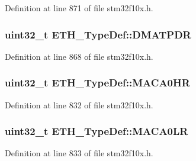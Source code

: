 Definition at line 871 of file stm32f10x.\+h.

\subsubsection[{\texorpdfstring{D\+M\+A\+T\+P\+DR}{DMATPDR}}]{ {\bf uint32\+\_\+t} E\+T\+H\+\_\+\+Type\+Def\+::\+D\+M\+A\+T\+P\+DR}\hypertarget{struct_e_t_h___type_def_aab836646e2e03cde9af74e439e875403}{}\label{struct_e_t_h___type_def_aab836646e2e03cde9af74e439e875403}


Definition at line 868 of file stm32f10x.\+h.

\subsubsection[{\texorpdfstring{M\+A\+C\+A0\+HR}{MACA0HR}}]{ {\bf uint32\+\_\+t} E\+T\+H\+\_\+\+Type\+Def\+::\+M\+A\+C\+A0\+HR}\hypertarget{struct_e_t_h___type_def_aee8d5fcb4edf8c156e70188d7ab24423}{}\label{struct_e_t_h___type_def_aee8d5fcb4edf8c156e70188d7ab24423}


Definition at line 832 of file stm32f10x.\+h.

\subsubsection[{\texorpdfstring{M\+A\+C\+A0\+LR}{MACA0LR}}]{ {\bf uint32\+\_\+t} E\+T\+H\+\_\+\+Type\+Def\+::\+M\+A\+C\+A0\+LR}\hypertarget{struct_e_t_h___type_def_a9c939e1e21924c888ee2c31dee9e810a}{}\label{struct_e_t_h___type_def_a9c939e1e21924c888ee2c31dee9e810a}


Definition at line 833 of file stm32f10x.\+h.


